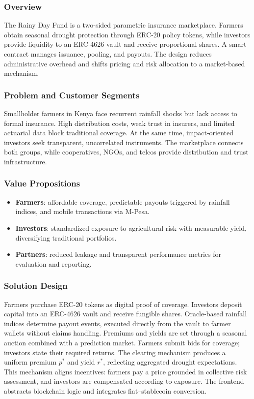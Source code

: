 \documentclass[11pt,a4paper]{article}
\begin{document}
	\subsubsection{Overview}
The Rainy Day Fund is a two-sided parametric insurance marketplace. Farmers obtain seasonal drought protection through ERC-20 policy tokens, while investors provide liquidity to an ERC-4626 vault and receive proportional shares. A smart contract manages issuance, pooling, and payouts. The design reduces administrative overhead and shifts pricing and risk allocation to a market-based mechanism.

	\subsubsection{Problem and Customer Segments}
Smallholder farmers in Kenya face recurrent rainfall shocks but lack access to formal insurance. High distribution costs, weak trust in insurers, and limited actuarial data block traditional coverage. At the same time, impact-oriented investors seek transparent, uncorrelated instruments. The marketplace connects both groups, while cooperatives, NGOs, and telcos provide distribution and trust infrastructure.

	\subsubsection{Value Propositions}
\begin{itemize}
    \item \textbf{Farmers}: affordable coverage, predictable payouts triggered by rainfall indices, and mobile transactions via M-Pesa.
    \item \textbf{Investors}: standardized exposure to agricultural risk with measurable yield, diversifying traditional portfolios.
    \item \textbf{Partners}: reduced leakage and transparent performance metrics for evaluation and reporting.
\end{itemize}

	\subsubsection{Solution Design}
Farmers purchase ERC-20 tokens as digital proof of coverage. Investors deposit capital into an ERC-4626 vault and receive fungible shares. Oracle-based rainfall indices determine payout events, executed directly from the vault to farmer wallets without claims handling. Premiums and yields are set through a seasonal auction combined with a prediction market. Farmers submit bids for coverage; investors state their required returns. The clearing mechanism produces a uniform premium $p^*$ and yield $r^*$, reflecting aggregated drought expectations. This mechanism aligns incentives: farmers pay a price grounded in collective risk assessment, and investors are compensated according to exposure. The frontend abstracts blockchain logic and integrates fiat--stablecoin conversion.
\end{document}
